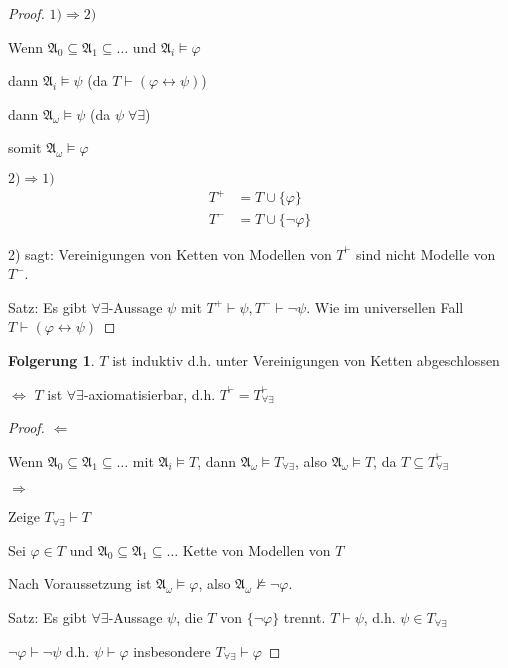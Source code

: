 \documentclass[12pt,parskip=full]{scrartcl}
\newcommand{\heading}{\underline}
\theoremstyle{definition}
\newtheorem{corollary}[theorem]{Folgerung}
\begin{document}
	\begin{proof}
		\heading{$1) \Rightarrow 2)$}
		
		Wenn $\mathfrak{A}_0 \subseteq \mathfrak{A}_1 \subseteq \dots$ und $\mathfrak{A}_i \models \varphi$
		
		dann $\mathfrak{A}_i \models \psi$ (da $T \vdash (\varphi \leftrightarrow \psi)$)
		
		dann $\mathfrak{A}_\omega \models \psi$ (da $\psi \; \forall\exists$)
		
		somit $\mathfrak{A}_\omega \models \varphi$
		
		\heading{$2) \Rightarrow 1)$}
		\begin{align*}
			T^+ &= T \cup \{ \varphi \} \\
			T^- &= T \cup \{ \lnot \varphi \}
		\end{align*}
		
		2) sagt: Vereinigungen von Ketten von Modellen von $T^\vdash$ sind nicht Modelle von $T^-$.
		
		Satz: Es gibt $\forall\exists$-Aussage $\psi$ mit $T^+ \vdash \psi, T^- \vdash \lnot \psi$. Wie im universellen Fall $T \vdash (\varphi \leftrightarrow \psi)$
	\end{proof}

	\begin{corollary}
		$T$ ist induktiv d.h. unter Vereinigungen von Ketten abgeschlossen

		$\Leftrightarrow$ $T$ ist $\forall\exists$-axiomatisierbar, d.h. $T^\vdash = T_{\forall\exists}^\vdash$
	\end{corollary}

	\begin{proof}
		\heading{$\Leftarrow$}
		
		Wenn $\mathfrak{A}_0 \subseteq \mathfrak{A}_1 \subseteq \dots$ mit $\mathfrak{A}_i \models T$, dann $\mathfrak{A}_\omega \models T_{\forall\exists}$, also $\mathfrak{A}_\omega \models T$, da $T \subseteq T_{\forall\exists}^\vdash$
		
		\heading{$\Rightarrow$}
		
		Zeige $T_{\forall\exists} \vdash T$
		
		Sei $\varphi \in T$ und $\mathfrak{A}_0 \subseteq \mathfrak{A}_1 \subseteq \dots$ Kette von Modellen von $T$
		
		Nach Voraussetzung ist $\mathfrak{A}_\omega \models \varphi$, also $\mathfrak{A}_\omega \not\models \lnot \varphi$.
		
		Satz: Es gibt $\forall\exists$-Aussage $\psi$, die $T$ von $\{ \lnot \varphi \}$ trennt. $T \vdash \psi$, d.h. $\psi \in T_{\forall\exists}$
		
		$\lnot \varphi \vdash \lnot \psi$ d.h. $\psi \vdash \varphi$ insbesondere $T_{\forall\exists} \vdash \varphi$
	\end{proof}
\end{document}
